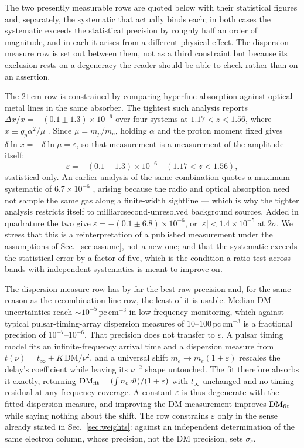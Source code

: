\documentclass[aps,prd,twocolumn,superscriptaddress,nofootinbib,10pt]{revtex4-2}
\begin{document}
The two presently measurable rows are quoted below with their statistical figures and, separately,
the systematic that actually binds each; in both cases the systematic exceeds the statistical
precision by roughly half an order of magnitude, and in each it arises from a different physical
effect. The dispersion-measure row is set out between them, not as a third constraint but because
its exclusion rests on a degeneracy the reader should be able to check rather than on an assertion.

The $21\,$cm row is constrained by comparing hyperfine absorption against optical metal lines in
the same absorber. The tightest such analysis reports $\Delta x / x = -(0.1 \pm 1.3) \times
10^{-6}$ over four systems at $1.17 < z < 1.56$, where $x \equiv g_p \alpha^{2}/\mu$
\citep{Rahmani2012}. Since $\mu = m_p/m_e$, holding $\alpha$ and the proton moment fixed gives
$\delta \ln x = -\delta \ln \mu = \varepsilon$, so that measurement is a measurement of the
amplitude itself:
%
\begin{equation}
  \varepsilon = -(0.1 \pm 1.3) \times 10^{-6} \quad (1.17 < z < 1.56),
  \label{eq:eps21}
\end{equation}
%
statistical only. An earlier analysis of the same combination
quotes a maximum systematic of $6.7 \times 10^{-6}$ \citep{Kanekar2010}, arising because the
radio and optical absorption need not sample the same gas along a finite-width sightline --- which
is why the tighter analysis restricts itself to milliarcsecond-unresolved background sources.
Added in quadrature the two give $\varepsilon = -(0.1 \pm 6.8) \times 10^{-6}$, or
$|\varepsilon| < 1.4 \times 10^{-5}$ at $2\sigma$. We stress that this is a reinterpretation of a
published measurement under the assumptions of Sec.~\ref{sec:assume}, not a new one; and that the
systematic exceeds the statistical error by a factor of five, which is the condition a ratio test
across bands with independent systematics is meant to improve on.

The dispersion-measure row has by far the best raw precision and, for the same reason as the
recombination-line row, the least of it is usable. Median DM uncertainties reach
$\sim\!10^{-5}\,\mathrm{pc\,cm^{-3}}$ in low-frequency monitoring, which against typical
pulsar-timing-array dispersion measures of $10$--$100\,\mathrm{pc\,cm^{-3}}$ is a fractional
precision of $10^{-7}$--$10^{-6}$. That precision does not transfer to $\varepsilon$. A pulsar
timing model fits an infinite-frequency arrival time and a dispersion measure from
$t(\nu) = t_{\infty} + K\,\mathrm{DM}/\nu^{2}$, and a universal shift $m_e \to m_e(1+\varepsilon)$
rescales the delay's coefficient while leaving its $\nu^{-2}$ shape untouched. The fit therefore
absorbs it exactly, returning $\mathrm{DM}_{\rm fit} = (\int n_e\,dl)/(1+\varepsilon)$ with
$t_{\infty}$ unchanged and no timing residual at any frequency coverage. A constant $\varepsilon$
is thus degenerate with the fitted dispersion measure, and improving the DM measurement improves
$\mathrm{DM}_{\rm fit}$ while saying nothing about the shift. The row constrains $\varepsilon$ only
in the sense already stated in Sec.~\ref{sec:weights}: against an independent determination of the
same electron column, whose precision, not the DM precision, sets $\sigma_\varepsilon$.
\end{document}
